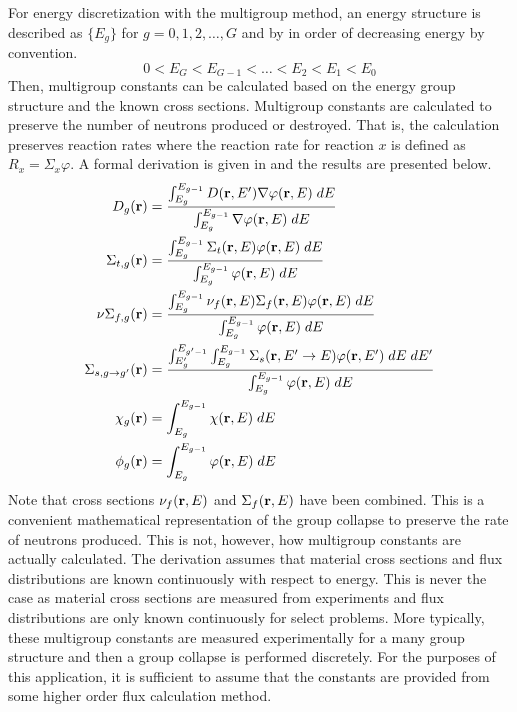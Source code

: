   For energy discretization with the multigroup method, an energy structure is 
  described as $\{E_g\}$ for $g = 0,1,2,\ldots,G$ and by in order of decreasing 
  energy by convention.
  \[ 0 < E_G < E_{G-1} < \ldots < E_2 < E_1 < E_0 \]
  Then, multigroup constants can be calculated based on the energy group 
  structure and the known cross sections. Multigroup constants are calculated to
  preserve the number of neutrons produced or destroyed. That is, the 
  calculation preserves reaction rates where the reaction rate for reaction $x$
  is defined as $R_x=\Sigma_x \varphi$. A formal derivation is given in 
  \cite{duderstathamilton} and the results are presented below.
  \begin{align}
    D_g(\mathbf{r}) &= \frac{\int_{E_g}^{E_{g-1}} D(\mathbf{r},E') \mathbf{\nabla} \varphi(\mathbf{r},E)\;dE}
      {\int_{E_g}^{E_{g-1}} \mathbf{\nabla} \varphi(\mathbf{r},E)\;dE} \\
    \Sigma_{t,g}(\mathbf{r}) &= \frac{\int_{E_g}^{E_{g-1}} \Sigma_t(\mathbf{r},E) 
      \varphi(\mathbf{r},E)\;dE}{\int_{E_g}^{E_{g-1}} \varphi(\mathbf{r},E)\;dE} \\
    \nu\Sigma_{f,g}(\mathbf{r}) &= \frac{\int_{E_g}^{E_{g-1}} \nu_f(\mathbf{r},E)
      \Sigma_f(\mathbf{r},E) \varphi(\mathbf{r},E)\;dE}{\int_{E_g}^{E_{g-1}} 
      \varphi(\mathbf{r},E)\;dE} \\
    \Sigma_{s,g\rightarrow g'}(\mathbf{r}) &= \frac{\int_{E_g'}^{E_{g'-1}} 
      \int_{E_g}^{E_{g-1}} \Sigma_s(\mathbf{r},E' \rightarrow E) 
      \varphi(\mathbf{r},E')\;dE\;dE'}
      {\int_{E_g}^{E_{g-1}} \varphi(\mathbf{r},E)\;dE}  \\
    \chi_g(\mathbf{r}) &= \int_{E_g}^{E_{g-1}} \chi(\mathbf{r},E) \; dE \\
    \phi_g(\mathbf{r}) &= \int_{E_g}^{E_{g-1}} \varphi(\mathbf{r},E) \; dE
  \end{align}
  Note that cross sections $\nu_f(\mathbf{r},E)$ and $\Sigma_f(\mathbf{r},E)$ have been 
  combined. This is a convenient mathematical representation of the group
  collapse to preserve the rate of neutrons produced. This is not, however, how
  multigroup constants are actually calculated. The derivation assumes that
  material cross sections and flux distributions are known continuously with
  respect to energy. This is never the case as material cross sections are
  measured from experiments and flux distributions are only known continuously
  for select problems. More typically, these multigroup constants are measured
  experimentally for a many group structure and then a group collapse is
  performed discretely. For the purposes of this application, it is sufficient
  to assume that the constants are provided from some higher order flux
  calculation method.

